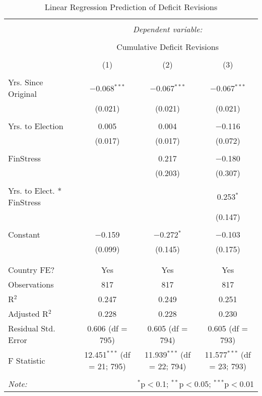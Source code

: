 
\begin{table}[!htbp] \centering 
  \caption{Linear Regression Prediction of Deficit Revisions} 
  \label{debt_results} 
\footnotesize 
\begin{tabular}{@{\extracolsep{5pt}}lccc} 
\\[-1.8ex]\hline 
\hline \\[-1.8ex] 
 & \multicolumn{3}{c}{\textit{Dependent variable:}} \\ 
\cline{2-4} 
\\[-1.8ex] & \multicolumn{3}{c}{Cumulative Deficit Revisions} \\ 
\\[-1.8ex] & (1) & (2) & (3)\\ 
\hline \\[-1.8ex] 
 Yrs. Since Original & $-$0.068$^{***}$ & $-$0.067$^{***}$ & $-$0.067$^{***}$ \\ 
  & (0.021) & (0.021) & (0.021) \\ 
  & & & \\ 
 Yrs. to Election & 0.005 & 0.004 & $-$0.116 \\ 
  & (0.017) & (0.017) & (0.072) \\ 
  & & & \\ 
 FinStress &  & 0.217 & $-$0.180 \\ 
  &  & (0.203) & (0.307) \\ 
  & & & \\ 
 Yrs. to Elect. * FinStress &  &  & 0.253$^{*}$ \\ 
  &  &  & (0.147) \\ 
  & & & \\ 
 Constant & $-$0.159 & $-$0.272$^{*}$ & $-$0.103 \\ 
  & (0.099) & (0.145) & (0.175) \\ 
  & & & \\ 
\hline \\[-1.8ex] 
Country FE? & Yes & Yes & Yes \\ 
Observations & 817 & 817 & 817 \\ 
R$^{2}$ & 0.247 & 0.249 & 0.251 \\ 
Adjusted R$^{2}$ & 0.228 & 0.228 & 0.230 \\ 
Residual Std. Error & 0.606 (df = 795) & 0.605 (df = 794) & 0.605 (df = 793) \\ 
F Statistic & 12.451$^{***}$ (df = 21; 795) & 11.939$^{***}$ (df = 22; 794) & 11.577$^{***}$ (df = 23; 793) \\ 
\hline 
\hline \\[-1.8ex] 
\textit{Note:}  & \multicolumn{3}{r}{$^{*}$p$<$0.1; $^{**}$p$<$0.05; $^{***}$p$<$0.01} \\ 
\end{tabular} 
\end{table} 
